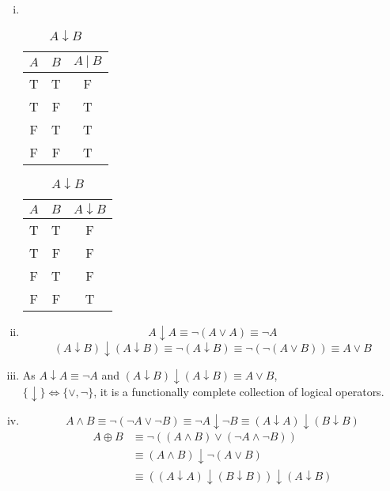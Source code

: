 \documentclass{article}
\begin{document}
\section{}
\begin{enumerate}[i)]
\item \ 
\begin{table}[!h]
\centering
\begin{minipage}{0.3\textwidth}
\begin{center}
\begin{tabular}{ccc}
\hline
$A$ & $B$ & $A\ |\ B$\\
\hline
T & T & F \\
T & F & T \\
F & T & T \\
F & F & T \\
\hline
\end{tabular}
\end{center}
\caption*{$A\ |\ B$}
\end{minipage}
\hfil
\begin{minipage}{0.3\textwidth}
\begin{center}
\begin{tabular}{ccc}
\hline
$A$ & $B$ & $A\downarrow B$\\
\hline
T & T & F \\
T & F & F \\
F & T & F \\
F & F & T \\
\hline
\end{tabular}
\end{center}
\caption*{$A\downarrow B$}
\end{minipage}

\end{table}

\item
$$A\downarrow A\equiv \lnot(A\lor A)\equiv \lnot A$$
$$(A\downarrow B)\downarrow(A\downarrow B)\equiv\lnot(A\downarrow B)
\equiv\lnot(\lnot(A\lor B))\equiv A\lor B$$

\item
As $A\downarrow A\equiv\lnot A$ and $(A\downarrow B)\downarrow(A\downarrow B)\equiv A\lor B$,\\
$\{\downarrow\}\Leftrightarrow\{\lor,\lnot\}$, it is a functionally complete collection of logical operators. 

\item
$$A\land B\equiv\lnot(\lnot A\lor\lnot B)\equiv\lnot A\downarrow\lnot B\equiv(A\downarrow A)\downarrow(B\downarrow B)$$
\begin{align*}
A\oplus B&\equiv\lnot((A\land B)\lor(\lnot A\land\lnot B))\\
&\equiv(A\land B)\downarrow\lnot(A\lor B)\\
&\equiv((A\downarrow A)\downarrow(B\downarrow B))\downarrow(A\downarrow B)
\end{align*}


\end{enumerate}
\end{document}
